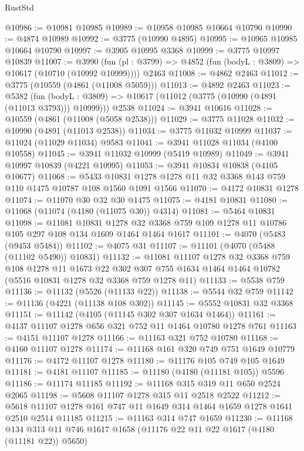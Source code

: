 \begin{lexlean}{RustStd}
\begin{coremodule}
@10986 := @10981 @10985
@10989 := @10958 @10985 @10664 @10790
@10990 := @4874 @10989
@10992 := @3775 (@10990 @4895)
@10995 := @10965 @10985 @10664 @10790
@10997 := @3905 @10995 @3368
@10999 := @3775 @10997 @10839
@11007 := @3990
    (fun (pl : @3799) => @4852 (fun (bodyL : @3809) => @10617 (@10710 (@10992 @10999))))
    @2463
@11008 := @4862 @2463
@11012 := @3775 (@10559 (@4861 (@11008 @5059)))
@11013 := @4892 @2463
@11023 := @5382
    (fun (bodyL : @3809) => @10617 (@11012 (@3775 (@10990 (@4891 (@11013 @3793))) @10999)))
    @2538
@11024 := @3941 @10616
@11028 := @10559 (@4861 (@11008 (@5058 @2538)))
@11029 := @3775 @11028
@11032 := @10990 (@4891 (@11013 @2538))
@11034 := @3775 @11032 @10999
@11037 := @11024 (@11029 @11034) @9583
@11041 := @3941 @11028 @11034 (@4100 @10558)
@11045 := @3941 @11032 @10999 (@5419 @10989)
@11049 := @3941 @10997 @10839 (@4221 @10995)
@11053 := @3941 @10834 @10838 (@4105 @10677)
@11068 := @5433 @10831 @1278 @1278 @11 @32 @3368 @143 @759 @110 @1475 @10787 @108 @1560 @1091 @1566
@11070 := @4172 @10831 @1278
@11074 := @11070 @30 @32 @30 @1475
@11075 := @4181 @10831
@11080 := @11068 (@11074 (@4180 (@11075 @30)) @4314)
@11081 := @5464 @10831
@11098 := @11081
    @10831
    @1278
    @32
    @3368
    @759
    @109
    @1278
    @11
    @10786
    @105
    @297
    @108
    @134
    @1609
    @1464
    @1464
    @1617
@11101 := @4070 (@5483 (@9453 @5484))
@11102 := @4075 @31
@11107 := @11101 (@4070 (@5488 (@11102 @5490)) @10831)
@11132 := @11081
    @11107
    @1278
    @32
    @3368
    @759
    @108
    @1278
    @11
    @1673
    @22
    @302
    @307
    @755
    @1634
    @1464
    @1464
    @10782
    (@5516 @10831 @1278 @32 @3368 @759 @1278 @11)
@11133 := @5538 @759
@11136 := @11132 (@5526 (@11133 @22))
@11138 := @5544 @32 @759
@11142 := @11136 (@4221 (@11138 @108 @302))
@11145 := @5552 @10831 @32 @3368
@11151 := @11142 (@4105 (@11145 @302 @307 @1634 @1464))
@11161 := @4137 @11107 @1278 @656 @321 @752 @11 @1464 @10780 @1278 @761
@11163 := @4151 @11107 @1278
@11166 := @11163 @321 @752 @10780
@11168 := @4160 @11107 @1278
@11174 := @11168 @161 @320 @749 @751 @1649 @10779
@11176 := @4172 @11107 @1278
@11180 := @11176 @105 @749 @105 @1649
@11181 := @4181 @11107
@11185 := @11180 (@4180 (@11181 @105)) @5596
@11186 := @11174 @11185
@11192 := @11168 @315 @319 @11 @650 @2524 @2065
@11198 := @5608 @11107 @1278 @315 @11 @2518 @2522
@11212 := @5618 @11107 @1278 @161 @747 @11 @1649 @314 @1464 @1659 @1278 @1641 @2510 @2514 @11185
@11215 := @11163 @314 @747 @1659
@11230 := @11168
    @134
    @313
    @11
    @746
    @1617
    @1658
    (@11176 @22 @11 @22 @1617 (@4180 (@11181 @22)) @5650)

\end{coremodule}
\end{lexlean}

